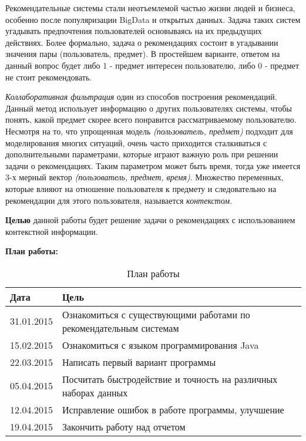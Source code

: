 
\setcounter{page}{5}

Рекомендательные системы стали неотъемлемой частью жизни людей и бизнеса, особенно после популяризации BigData и открытых данных. Задача таких систем угадывать предпочтения пользователей основываясь на их предыдущих действиях. Более формально, задача о рекомендациях состоит в угадывании значения пары (пользователь, предмет). В простейшем варианте, ответом на данный вопрос будет либо 1 - предмет интересен пользователю, либо 0 - предмет не стоит рекомендовать.\par \textit{Коллаборативная фильтрация} один из способов построения рекомендаций. Данный метод использует информацию о других пользователях системы, чтобы понять, какой предмет скорее всего понравится рассматриваемому пользователю. Несмотря на то, что упрощенная модель \textit{(пользователь, предмет)} подходит для моделирования многих ситуаций, очень часто приходится сталкиваться с дополнительными параметрами, которые играют важную роль при решении задачи о рекомендациях. Таким параметром может быть время, тогда уже имеется 3-х мерный вектор \textit{(пользователь, предмет, время)}. Множество переменных, которые влияют на отношение пользователя к предмету и следовательно на рекомендации для этого пользователя, называется \textit{контекстом}. 

\textbf{Целью} данной работы будет решение задачи о рекомендациях с использованием контекстной информации.

\clearpage

\textbf{План работы:} 
\begin{table} [htbp]
  \centering
  \parbox{15cm}{\caption{План работы}\label{Ts0Sib}}
  \begin{tabular}{| p{3cm} || p{12cm}l |}
  \hline
  \hline
  Дата & Цель & \\
  \hline
  \hline
  31.01.2015 & Ознакомиться с существующими работами по рекомендательным системам \cite{IgnatovFCA, IgnatovWitology, XavierAmatriain, Alqadah2014} & \\
  \hline
  15.02.2015 & Ознакомиться с языком программирования Java \cite{EckelJava} & \\
  \hline
  22.03.2015 & Написать первый вариант программы & \\
  \hline
  05.04.2015 & Посчитать быстродействие и точность на различных наборах данных & \\
  \hline
  12.04.2015 & Исправление ошибок в работе программы, улучшение & \\
  \hline
  19.04.2015 & Закончить работу над отчетом & \\
  \hline
  \hline
  \end{tabular}
\end{table}

\clearpage